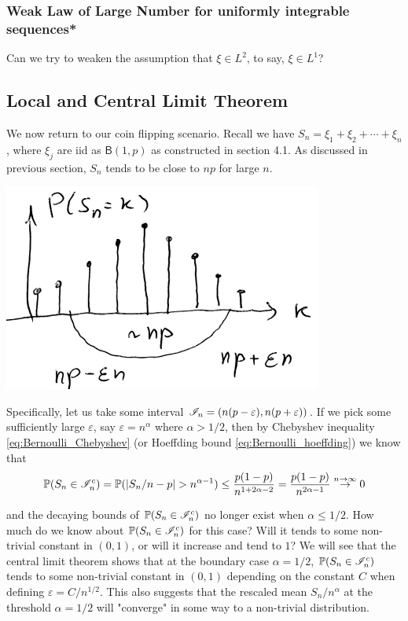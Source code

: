 \subsubsection{Weak Law of Large Number for uniformly integrable sequences*}
\begin{unexaminable}
Can we try to weaken the assumption that $\xi \in L^2$, to say, $\xi \in L^1$?
\end{unexaminable}

\subsection{Local and Central Limit Theorem}
We now return to our coin flipping scenario. Recall we have $S_n = \xi_1 + \xi_2 + \cdots + \xi_n$, where $\xi_j$ are iid as $\mathsf{B}(1,p)$ as constructed in section 4.1. As discussed in previous section, $S_n$ tends to be close to $np$ for large $n$. 
\begin{center}
    \includegraphics[scale=0.8]{sa.png}
\end{center}

Specifically, let us take some interval $\mathcal{I}_n = (n(p-\varepsilon), n(p+\varepsilon))$. If we pick some sufficiently large $\varepsilon$, say $\varepsilon = n^{\alpha}$ where $\alpha > 1/2$, then by Chebyshev inequality  \eqref{eq:Bernoulli_Chebyshev} (or Hoeffding bound \eqref{eq:Bernoulli_hoeffding}) we know that
\begin{equation} \label{eq:binomial_concentration}
\mathbb{P}(S_n \in \mathcal{I}_n^c) = \mathbb{P}(|S_n/n - p| > n^{\alpha - 1}) \leq \frac{p(1-p)}{n^{1+2\alpha - 2}} = \frac{p(1-p)}{n^{2\alpha - 1}} \overset{n \to \infty}{\to} 0
\end{equation}

and the decaying bounds of $\mathbb{P}(S_n \in \mathcal{I}_n^c)$ no longer exist when $\alpha \leq 1/2$. How much do we know about $\mathbb{P}(S_n \in \mathcal{I}_n^c)$ for this case? Will it tends to some non-trivial constant in $(0,1)$, or will it increase and tend to $1$? We will see that the central limit theorem shows that at the boundary case $\alpha = 1/2$, $\mathbb{P}(S_n \in \mathcal{I}_n^c)$ tends to some non-trivial constant in $(0,1)$ depending on the constant $C$ when defining $\varepsilon = C/n^{1/2}$. This also suggests that the rescaled mean $S_n/n^\alpha$ at the threshold $\alpha = 1/2$ will "converge" in some way to a non-trivial distribution.

